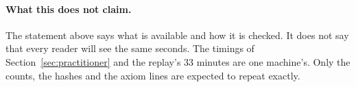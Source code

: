 \paragraph{What this does not claim.} The statement above says what is
available and how it is checked. It does not say that every reader will see the
same seconds. The timings of Section~\ref{sec:practitioner} and the
replay's 33 minutes are one machine's. Only the counts, the hashes
and the axiom lines are expected to repeat exactly.
